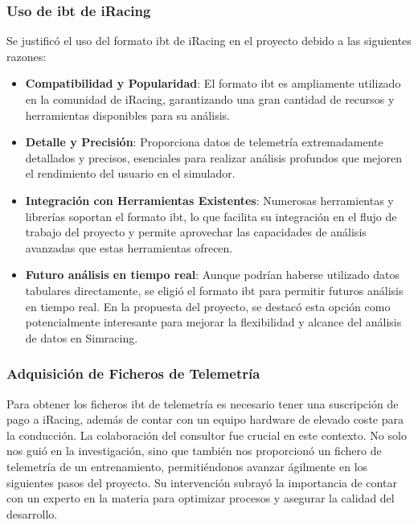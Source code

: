 \subsubsection*{Uso de \ac{ibt} de iRacing}
Se justificó el uso del formato \ac{ibt} de iRacing en el proyecto debido a las siguientes razones:

\begin{itemize}
    \item \textbf{Compatibilidad y Popularidad}: El formato \ac{ibt} es ampliamente utilizado en la comunidad de iRacing, garantizando una gran cantidad de recursos y herramientas disponibles para su análisis.
    \item \textbf{Detalle y Precisión}: Proporciona datos de telemetría extremadamente detallados y precisos, esenciales para realizar análisis profundos que mejoren el rendimiento del usuario en el simulador.
    \item \textbf{Integración con Herramientas Existentes}: Numerosas herramientas y librerías soportan el formato \ac{ibt}, lo que facilita su integración en el flujo de trabajo del proyecto y permite aprovechar las capacidades de análisis avanzadas que estas herramientas ofrecen.
    \item \textbf{Futuro análisis en tiempo real}: Aunque podrían haberse utilizado datos tabulares directamente, se eligió el formato \ac{ibt} para permitir futuros análisis en tiempo real. En la propuesta del proyecto, se destacó esta opción como potencialmente interesante para mejorar la flexibilidad y alcance del análisis de datos en Simracing.
\end{itemize}

\subsubsection*{Adquisición de Ficheros de Telemetría}

Para obtener los ficheros \ac{ibt} de telemetría es necesario tener una suscripción de pago a iRacing, además de contar con un equipo hardware de elevado coste para la conducción. La colaboración del consultor fue crucial en este contexto. No solo nos guió en la investigación, sino que también nos proporcionó un fichero de telemetría de un entrenamiento, permitiéndonos avanzar ágilmente en los siguientes pasos del proyecto. Su intervención subrayó la importancia de contar con un experto en la materia para optimizar procesos y asegurar la calidad del desarrollo.


